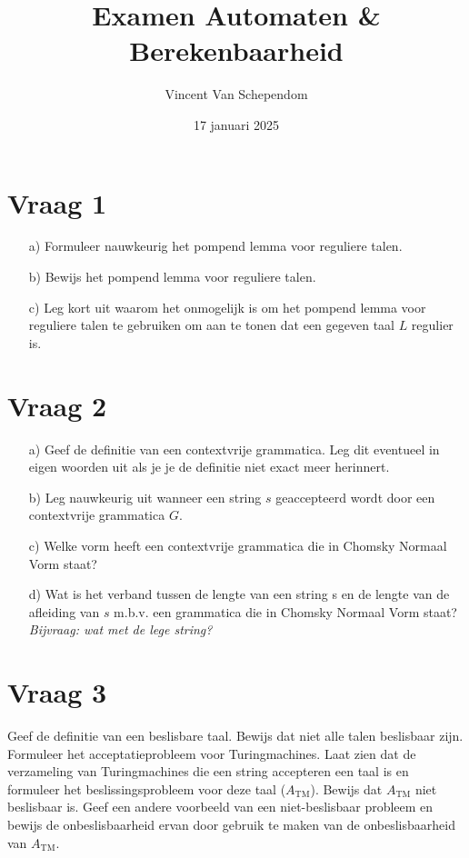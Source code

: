 \documentclass[kulak]{kulakarticle}
\title{Examen Automaten \& Berekenbaarheid}
\author{Vincent Van Schependom}
\date{17 januari 2025}
\begin{document}
	\maketitle

	\section*{Vraag 1}

	\begin{enumerate}
		\item[a)] Formuleer nauwkeurig het pompend lemma voor reguliere talen.
		\item[b)] Bewijs het pompend lemma voor reguliere talen.
		\item[c)] Leg kort uit waarom het onmogelijk is om het pompend lemma voor reguliere talen te gebruiken om aan te tonen dat een gegeven taal \(L\) regulier is.
	\end{enumerate}

	\section*{Vraag 2}

	\begin{enumerate}
		\item[a)] Geef de definitie van een contextvrije grammatica. Leg dit eventueel in eigen woorden uit als je je de definitie niet exact meer herinnert.
		\item[b)] Leg nauwkeurig uit wanneer een string \(s\) geaccepteerd wordt door een contextvrije grammatica \(G\).
		\item[c)] Welke vorm heeft een contextvrije grammatica die in Chomsky Normaal Vorm staat?
		\item[d)] Wat is het verband tussen de lengte van een string s en de lengte van de afleiding van \(s\) m.b.v. een grammatica die in Chomsky Normaal Vorm staat? \\
		\textit{Bijvraag: wat met de lege string?}
	\end{enumerate}

	\section*{Vraag 3}

	Geef de definitie van een beslisbare taal. Bewijs dat niet alle talen beslisbaar zijn. Formuleer het acceptatieprobleem voor Turingmachines. Laat zien dat de verzameling van Turingmachines die een string accepteren een taal is en formuleer het beslissingsprobleem voor deze taal (\(A_\text{TM}\)). Bewijs dat \(A_\text{TM}\) niet beslisbaar is. Geef een andere voorbeeld van een niet-beslisbaar probleem en bewijs de onbeslisbaarheid ervan door gebruik te maken van de onbeslisbaarheid van \(A_\text{TM}\).
\end{document}
